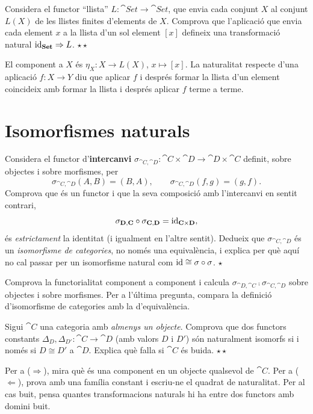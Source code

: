 \begin{exercici}
Considera el functor \enquote{llista} $L\colon\cat{Set}\to\cat{Set}$, que envia cada conjunt $X$ al conjunt $L(X)$ de les llistes finites d'elements de $X$. Comprova que l'aplicació que envia cada element $x$ a la llista d'un sol element $[x]$ defineix una transformació natural $\operatorname{id}_{\mathbf{Set}}\Rightarrow L$. \hfill{\normalfont$\star\star$}
\begin{indicacio}
El component a $X$ és $\eta_X\colon X\to L(X)$, $x\mapsto[x]$. La naturalitat respecte d'una aplicació $f\colon X\to Y$ diu que aplicar $f$ i després formar la llista d'un element coincideix amb formar la llista i després aplicar $f$ terme a terme.
\end{indicacio}
\end{exercici}

\section{Isomorfismes naturals}

\begin{exercici}
Considera el functor d'\textbf{intercanvi} $\sigma_{\cat{C},\cat{D}}\colon\cat{C}\times\cat{D}\to\cat{D}\times\cat{C}$ definit, sobre objectes i sobre morfismes, per
\[
\sigma_{\cat{C},\cat{D}}(A,B)=(B,A),
\qquad
\sigma_{\cat{C},\cat{D}}(f,g)=(g,f).
\]
Comprova que és un functor i que la seva composició amb l'intercanvi en sentit contrari,
\[
\sigma_{\mathbf{D},\mathbf{C}}\circ\sigma_{\mathbf{C},\mathbf{D}}=\operatorname{id}_{\mathbf{C}\times\mathbf{D}},
\]
és \emph{estrictament} la identitat (i igualment en l'altre sentit). Dedueix que $\sigma_{\cat{C},\cat{D}}$ és un \emph{isomorfisme de categories}, no només una equivalència, i explica per què aquí no cal passar per un isomorfisme natural com $\operatorname{id}\cong\sigma\circ\sigma$. \hfill{\normalfont$\star$}
\begin{indicacio}
Comprova la functorialitat component a component i calcula $\sigma_{\cat{D},\cat{C}}\comp\sigma_{\cat{C},\cat{D}}$ sobre objectes i sobre morfismes. Per a l'última pregunta, compara la definició d'isomorfisme de categories amb la d'equivalència.
\end{indicacio}
\end{exercici}

\begin{exercici}
Sigui $\cat{C}$ una categoria amb \emph{almenys un objecte}. Comprova que dos functors constants $\Delta_D,\Delta_{D'}\colon\cat{C}\to\cat{D}$ (amb valors $D$ i $D'$) són naturalment isomorfs si i només si $D\cong D'$ a $\cat{D}$. Explica què falla si $\cat{C}$ és buida. \hfill{\normalfont$\star\star$}
\begin{indicacio}
Per a ($\Rightarrow$), mira què és una component en un objecte qualsevol de $\cat{C}$. Per a ($\Leftarrow$), prova amb una família constant i escriu-ne el quadrat de naturalitat. Per al cas buit, pensa quantes transformacions naturals hi ha entre dos functors amb domini buit.
\end{indicacio}
\end{exercici}


